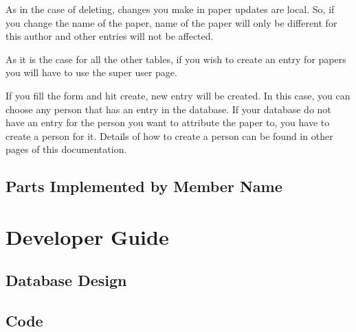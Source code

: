 \documentclass[letterpaper,10pt,english]{sphinxmanual}
\begin{document}
\begin{figure}[htbp]
\centering

\noindent{}
\end{figure}

As in the case of deleting, changes you make in paper updates are local. So, if you change the name
of the paper, name of the paper will only be different for this author and other entries
will not be affected.

As it is the case for all the other tables, if you wish to create an entry for papers you
will have to use the super user page.

\begin{figure}[htbp]
\centering

\noindent{}
\end{figure}

If you fill the form and hit create, new entry will be created. In this case, you can choose any person
that has an entry in the database. If your database do not have an entry for the person you want to
attribute the paper to, you have to create a person for it. Details of how to create a person can be found
in other pages of this documentation.


\section{Parts Implemented by Member Name}
\label{\detokenize{user/member3:parts-implemented-by-member-name}}\label{\detokenize{user/member3::doc}}

\chapter{Developer Guide}
\label{\detokenize{developer/index:developer-guide}}\label{\detokenize{developer/index::doc}}

\section{Database Design}
\label{\detokenize{developer/index:database-design}}



\section{Code}
\label{\detokenize{developer/index:code}}
\end{document}
